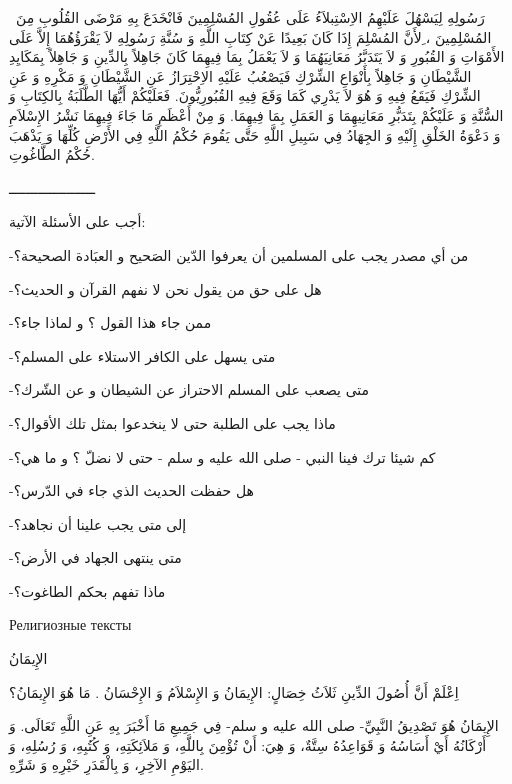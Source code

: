 \documentclass[a5paper]{article}
\begin{document}
\ رَسُولِهِ لِيَسْهُلَ عَلَيْهِمُ الاِسْتِبلاَءُ عَلَى عُقُولِ المُسْلِمِينَ فَانْخَدَعَ بِهِ مَرْضَى القُلُوبِ مِنَ المُسْلِمِينَ ، ِلأَنَّ المُسْلِمَ إِذَا كَانَ بَعِيدًا عَنْ كِتَابِ اللَّهِ وَ سُنَّةِ رَسُولِهِ لاَ يَقْرَؤُهُمَا إِلاَّ عَلَى الأَمْوَاتِ وَ القُبُورِ وَ لاَ يَتَدَبَّرُ مَعَانِيَهُمَا وَ لاَ يَعْمَلُ بِمَا فِيهِمَا كَانَ جَاهِلاً بِالدِّينِ وَ جَاهِلاً بِمَكَايِدِ الشَّيْطَانِ وَ جَاهِلاً بِأَنْوَاعِ الشِّرْكِ فَيَصْعُبُ عَلَيْهِ الاِحْتِرَازُ عَنِ الشَّيْطَانِ وَ مَكْرِهِ وَ عَنِ الشِّرْكِ فَيَقَعُ فِيهِ وَ هُوَ لاَ يَدْرِي كَمَا وَقَعَ فِيهِ القُبُورِيُّونَ. فَعَلَيْكُمْ أَيُّهَا الطَّلَبَةُ بِالكِتَابِ وَ السُّنَّةِ وَ عَلَيْكُمْ بِتَدَبُّرِ مَعَانِيهِمَا وَ العَمَلِ بِمَا فِيهِمَا. وَ مِنْ أَعْظَمِ مَا جَاءَ فِيهِمَا نَشْرُ الإِسْلاَمِ وَ دَعْوَةُ الخَلْقِ إِلَيْهِ وَ الجِهَادُ فِي سَبِيلِ اللَّهِ حَتَّى يَقُومَ حُكْمُ اللَّهِ فِي الأَرْضِ كُلِّهَا وَ يَذْهَبَ حُكْمُ الطَّاغُوتِ. 

ـــــــــــــــــــــ

أجب على الأسئلة الآتية:

-من أي مصدر يجب على المسلمين أن يعرفوا الدّين الصَحيح و العبَادة الصحيحة؟

-هل على حق من يقول نحن لا نفهم القرآن و الحديث؟

-ممن جاء هذا القول ؟ و لماذا جاء؟

-متى يسهل على الكافر الاستلاء على المسلم؟

-متى يصعب على المسلم الاحتراز عن الشيطان و عن الشّرك؟

-ماذا يجب على الطلبة حتى لا ينخدعوا بمثل تلك الأقوال؟

-كم شيئا ترك فينا النبي - صلى الله عليه و سلم - حتى لا نضلّ ؟ و ما هي؟

-هل حفظت الحديث الذي جاء في الدّرس؟

-إلى متى يجب علينا أن نجاهد؟

-متى ينتهى الجهاد في الأرض؟

-ماذا تفهم بحكم الطاغوت؟

Религиозные тексты

الإِيمَانُ

اِعْلَمْ أَنَّ أُصُولَ الدِّينِ ثَلاَثُ خِصَالٍ: الإِيمَانُ وَ الإِسْلاَمُ وَ الإِحْسَانُ . مَا هُوَ الإِيمَانُ؟

الإِيمَانُ هُوَ تَصْدِيقُ النَّبِيِّ- صلى الله عليه و سلم- فِي جَمِيعِ مَا أَخْبَرَ بِهِ عَنِ اللَّهِ تَعَالَى. وَ أَرْكَانُهُ أَيْ أَسَاسُهُ وَ قَوَاعِدُهُ سِتَّةٌ، وَ هِيَ: أَنْ تُؤْمِنَ بِاللَّهِ، وَ مَلاَئِكَتِهِ، وَ كُتُبِهِ، وَ رُسُلِهِ، وَ اليَوْمِ الآخِرِ، وَ بِالْقَدَرِ خَيْرِهِ وَ شَرِّهِ. 
\end{document}
